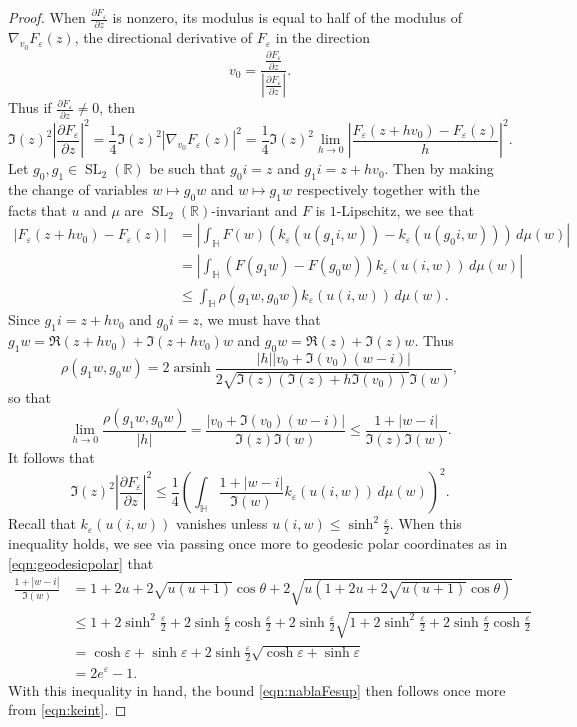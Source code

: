 \documentclass[10pt,a4paper]{amsart}
\DeclareMathOperator{\SL}{SL}
\DeclareMathOperator{\arsinh}{arsinh}
\newcommand{\Hb}{\mathbb{H}}
\newcommand{\R}{\mathbb{R}}
\newcommand{\dee}{\partial}
\newcommand{\e}{\varepsilon}
\begin{document}
\begin{proof}
When $\frac{\dee F_{\e}}{\dee z}$ is nonzero, its modulus is equal to half of the modulus of $\nabla_{v_0} F_{\e}(z)$, the directional derivative of $F_{\e}$ in the direction
\[v_0 = \frac{\frac{\dee F_{\e}}{\dee z}}{\left|\frac{\dee F_{\e}}{\dee z}\right|}.\]
Thus if $\frac{\dee F_{\e}}{\dee z} \neq 0$, then
\[\Im(z)^2 \left|\frac{\dee F_{\e}}{\dee z}\right|^2 = \frac{1}{4} \Im(z)^2 \left|\nabla_{v_0} F_{\e}(z)\right|^2 = \frac{1}{4} \Im(z)^2 \lim_{h \to 0} \left|\frac{F_{\e}(z + hv_0) - F_{\e}(z)}{h}\right|^2.\]
Let $g_0,g_1 \in \SL_2(\R)$ be such that $g_0 i = z$ and $g_1 i = z + hv_0$. Then by making the change of variables $w \mapsto g_0 w$ and $w \mapsto g_1 w$ respectively together with the facts that $u$ and $\mu$ are $\SL_2(\R)$-invariant and $F$ is $1$-Lipschitz, we see that
\begin{align*}
\left|F_{\e}(z + hv_0) - F_{\e}(z)\right| & = \left|\int_{\Hb} F(w) \left(k_{\e}(u(g_1 i,w)) - k_{\e}(u(g_0 i,w))\right) \, d\mu(w)\right|	\\
& = \left|\int_{\Hb} \left(F(g_1 w) - F(g_0 w)\right) k_{\e}(u(i,w)) \, d\mu(w)\right|	\\
& \leq \int_{\Hb} \rho(g_1 w,g_0 w) k_{\e}(u(i,w)) \, d\mu(w).
\end{align*}
Since $g_1 i = z + hv_0$ and $g_0 i = z$, we must have that $g_1 w = \Re(z + hv_0) + \Im(z + hv_0)w$ and $g_0 w = \Re(z) + \Im(z)w$. Thus
\[\rho(g_1 w,g_0 w) = 2 \arsinh \frac{|h| \left|v_0 + \Im(v_0) (w - i)\right|}{2\sqrt{\Im(z)(\Im(z) + h \Im(v_0))} \Im(w)},\]
so that
\[\lim_{h \to 0} \frac{\rho(g_1 w,g_0 w)}{|h|} = \frac{\left|v_0 + \Im(v_0) (w - i)\right|}{\Im(z) \Im(w)} \leq \frac{1 + |w - i|}{\Im(z) \Im(w)}.\]
It follows that
\[\Im(z)^2 \left|\frac{\dee F_{\e}}{\dee z}\right|^2 \leq \frac{1}{4} \left(\int_{\Hb} \frac{1 + |w - i|}{\Im(w)} k_{\e}(u(i,w)) \, d\mu(w)\right)^2.\]
Recall that $k_{\e}(u(i,w))$ vanishes unless $u(i,w) \leq \sinh^2 \frac{\e}{2}$. When this inequality holds, we see via passing once more to geodesic polar coordinates as in \eqref{eqn:geodesicpolar} that
\begin{align*}
\frac{1 + |w - i|}{\Im(w)} & = 1 + 2u + 2 \sqrt{u(u + 1)} \cos \theta + 2\sqrt{u \left(1 + 2u + 2\sqrt{u(u + 1)} \cos \theta\right)}	\\
& \leq 1 + 2 \sinh^2 \frac{\e}{2} + 2 \sinh \frac{\e}{2} \cosh \frac{\e}{2} + 2 \sinh \frac{\e}{2} \sqrt{1 + 2 \sinh^2 \frac{\e}{2} + 2 \sinh \frac{\e}{2} \cosh \frac{\e}{2}}	\\
& = \cosh \e + \sinh \e + 2 \sinh \frac{\e}{2} \sqrt{\cosh \e + \sinh \e}	\\
& = 2e^{\e} - 1.
\end{align*}
With this inequality in hand, the bound \eqref{eqn:nablaFesup} then follows once more from \eqref{eqn:keint}.
\end{proof}
\end{document}
